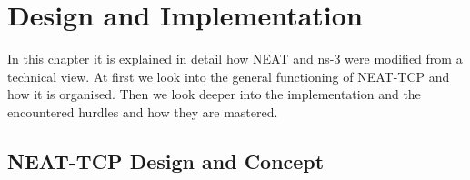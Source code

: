 \chapter{Design and Implementation}\label{ch:implementation} %
\glsresetall %

In this chapter it is explained in detail how NEAT and ns-3 were modified from a technical view. At first we look into the general functioning of NEAT-TCP and how it is organised. Then we look deeper into the implementation and the encountered hurdles and how they are mastered.

\section{NEAT-TCP Design and Concept}\label{sec:neatOrganisation}

